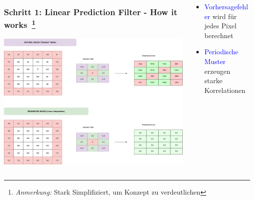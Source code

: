 \documentclass[11pt,t,usepdftitle=false,aspectratio=169]{beamer}
\begin{document}
\begin{frame}
	\begin{columns}[T]
		\begin{column}{0.60\textwidth}
			\frametitle{Schritt 1: Linear Prediction Filter - How it works~\footnote{\textit{Anmerkung:} Stark Simplifiziert, um Konzept zu verdeutlichen}}
			\includegraphics[width=\textwidth]{images/apply_filter.png}
		\end{column}
		\begin{column}{0.38\textwidth}
			\begin{itemize}
				\item \textcolor{blue}{Vorhersagefehler} wird für jedes Pixel berechnet
				\item \textcolor{blue}{Periodische Muster} erzeugen starke Korrelationen
			\end{itemize}
		\end{column}			
	\end{columns}

\end{frame}
\end{document}
